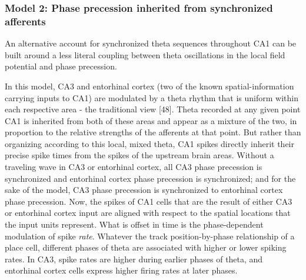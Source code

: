 \documentclass[]{article}
\begin{document}
\subsubsection{Model 2: Phase precession inherited from synchronized
afferents}

An alternative account for synchronized theta sequences throughout CA1
can be built around a less literal coupling between theta oscillations
in the local field potential and phase precession.

In this model, CA3 and entorhinal cortex (two of the known
spatial-information carrying inputs to CA1) are modulated by a theta
rhythm that is uniform within each respective area - the traditional
view {[}48{]}. Theta recorded at any given point CA1 is inherited from
both of these areas and appear as a mixture of the two, in proportion to
the relative strengths of the afferents at that point. But rather than
organizing according to this local, mixed theta, CA1 spikes directly
inherit their precise spike times from the spikes of the upstream brain
areas. Without a traveling wave in CA3 or entorhinal cortex, all CA3
phase precession is synchronized and entorhinal cortex phase precession
is synchronized; and for the sake of the model, CA3 phase precession is
synchronized to entorhinal cortex phase precession. Now, the spikes of
CA1 cells that are the result of either CA3 or entorhinal cortex input
are aligned with respect to the spatial locations that the input units
represent. What is offset in time is the phase-dependent modulation of
spike \emph{rate}. Whatever the track position-by-phase relationship of
a place cell, different phases of theta are associated with higher or
lower spiking rates. In CA3, spike rates are higher during earlier
phases of theta, and entorhinal cortex cells express higher firing rates
at later phases.
\end{document}
